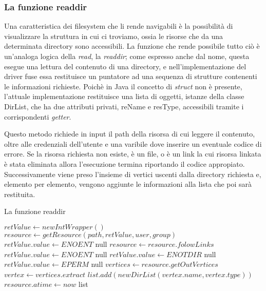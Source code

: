 \newpage

\subsubsection{La funzione readdir}
Una caratteristica dei filesystem che li rende navigabili è la possibilità di visualizzare la struttura in cui ci troviamo, ossia le risorse che da una determinata directory sono accessibili. La funzione che rende possibile tutto ciò è un'analoga logica della \emph{read}, la \emph{readdir}; come espresso anche dal nome, questa esegue una lettura del contenuto di una directory, e nell'implementazione del driver fuse essa restituisce un puntatore ad una sequenza di strutture contenenti le informazioni richieste. Poichè in Java il concetto di \emph{struct} non è presente, l'attuale implementazione restituisce una lista di oggetti, istanze della classe DirList, che ha due attributi privati, reName e resType, accessibili tramite i corrispondenti \emph{getter}. 

Questo metodo richiede in input il path della risorsa di cui leggere il contenuto, oltre alle credenziali dell'utente e una varibile dove inserire un eventuale codice di errore. Se la risorsa richiesta non esiste, è un file, o è un link la cui risorsa linkata è stata eliminata allora l'esecuzione termina riportando il codice appropiato. Successivamente viene preso l'insieme di vertici uscenti dalla directory richiesta e, elemento per elemento, vengono aggiunte le informazioni alla lista che poi sarà restituita.

\begin{algorithm}
\begin{algorithmic}[5]
\caption{La funzione readdir}
	\State $retValue \gets new IntWrapper()$
	\State $resource \gets getResource(path, retValue, user, group)$
		\State $retValue.value \gets ENOENT$
		\State \Return null
	\EndIf
		\State $resource \gets resource.folowLinks$
	\EndIf
		\State $retValue.value \gets ENOENT$
		\State \Return null
		\State $retValue.value \gets ENOTDIR$
		\State \Return null
	\EndIf
		\State $retValue.value \gets EPERM$
		\State \Return null
	\EndIf
	\State $vertices \gets resource.getOutVertices$
		\State $vertex \gets vertices.extract$
		\State $list.add(new DirList(vertex.name, vertex.type))$
	\EndWhile
	\State $resource.atime \gets now$
	\State \Return list
\EndFunction
\end{algorithmic}
\end{algorithm}

